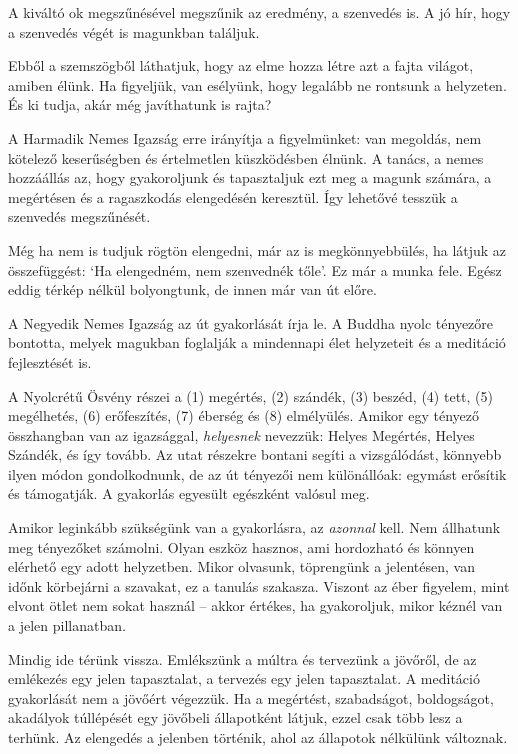 
A kiváltó ok megszűnésével megszűnik az eredmény, a szenvedés is. A jó
hír, hogy a szenvedés végét is magunkban találjuk.

Ebből a szemszögből láthatjuk, hogy az elme hozza létre azt a fajta
világot, amiben élünk. Ha figyeljük, van esélyünk, hogy legalább ne
rontsunk a helyzeten. És ki tudja, akár még javíthatunk is rajta?

A Harmadik Nemes Igazság erre irányítja a figyelmünket: van megoldás,
nem kötelező keserűségben és értelmetlen küszködésben élnünk. A tanács,
a nemes hozzáállás az, hogy gyakoroljunk és tapasztaljuk ezt meg a
magunk számára, a megértésen és a ragaszkodás elengedésén keresztül. Így
lehetővé tesszük a szenvedés megszűnését.

\clearpage

Még ha nem is tudjuk rögtön elengedni, már az is megkönnyebbülés, ha
látjuk az összefüggést: `Ha elengedném, nem szenvednék tőle'.
Ez már a munka fele. Egész eddig térkép nélkül bolyongtunk, de innen már
van út előre.


A Negyedik Nemes Igazság az út gyakorlását írja le. A Buddha nyolc
tényezőre bontotta, melyek magukban foglalják a mindennapi élet
helyzeteit és a meditáció fejlesztését is.

A Nyolcrétű Ösvény részei a (1) megértés, (2) szándék, (3) beszéd, (4)
tett, (5) megélhetés, (6) erőfeszítés, (7) éberség és (8) elmélyülés.
Amikor egy tényező összhangban van az igazsággal, \emph{helyesnek}
nevezzük: Helyes Megértés, Helyes Szándék, és így tovább. Az utat
részekre bontani segíti a vizsgálódást, könnyebb ilyen módon
gondolkodnunk, de az út tényezői nem különállóak: egymást erősítik és
támogatják. A gyakorlás egyesült egészként valósul meg.

Amikor leginkább szükségünk van a gyakorlásra, az \emph{azonnal} kell.
Nem állhatunk meg tényezőket számolni. Olyan eszköz hasznos, ami
hordozható és könnyen elérhető egy adott helyzetben. Mikor olvasunk,
töprengünk a jelentésen, van időnk körbejárni a szavakat, ez a tanulás
szakasza. Viszont az éber figyelem, mint elvont ötlet nem sokat használ
-- akkor értékes, ha gyakoroljuk, mikor kéznél van a jelen pillanatban.

\enlargethispage*{\baselineskip}

Mindig ide térünk vissza. Emlékszünk a múltra és tervezünk a jövőről, de
az emlékezés egy jelen tapasztalat, a tervezés egy jelen tapasztalat. A
meditáció gyakorlását nem a jövőért végezzük. Ha a megértést,
szabadságot, boldogságot, akadályok túllépését egy jövőbeli állapotként
látjuk, ezzel csak több lesz a terhünk. Az elengedés a jelenben
történik, ahol az állapotok nélkülünk változnak.
